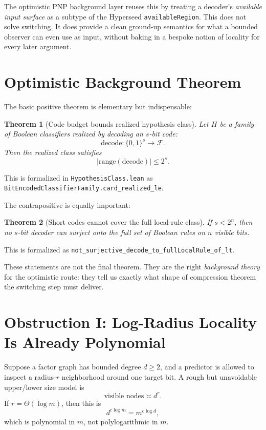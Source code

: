 \documentclass[11pt]{article}
\newtheorem{theorem}{Theorem}[section]
\theoremstyle{remark}
\begin{document}
The optimistic PNP background layer reuses this by treating a decoder's \emph{available
input surface} as a subtype of the Hyperseed \texttt{availableRegion}.  This does not solve
switching.  It does provide a clean ground-up semantics for what a bounded observer can even
use as input, without baking in a bespoke notion of locality for every later argument.

\section{Optimistic Background Theorem}

The basic positive theorem is elementary but indispensable:

\begin{theorem}[Code budget bounds realized hypothesis class]
Let \(H\) be a family of Boolean classifiers realized by decoding an \(s\)-bit code:
\[
  \mathrm{decode} : \{0,1\}^s \to \mathcal{F}.
\]
Then the realized class satisfies
\[
  |\mathrm{range}(\mathrm{decode})| \le 2^s.
\]
\end{theorem}

\noindent
This is formalized in \texttt{HypothesisClass.lean} as
\texttt{BitEncodedClassifierFamily.card\_realized\_le}.

The contrapositive is equally important:

\begin{theorem}[Short codes cannot cover the full local-rule class]
If \(s < 2^n\), then no \(s\)-bit decoder can surject onto the full set of Boolean rules on
\(n\) visible bits.
\end{theorem}

\noindent
This is formalized as
\texttt{not\_surjective\_decode\_to\_fullLocalRule\_of\_lt}.

These statements are not the final theorem.  They are the right \emph{background theory} for
the optimistic route: they tell us exactly what shape of compression theorem the switching
step must deliver.

\section{Obstruction I: Log-Radius Locality Is Already Polynomial}

Suppose a factor graph has bounded degree $d \ge 2$, and a predictor is allowed to inspect a
radius-$r$ neighborhood around one target bit.  A rough but unavoidable upper/lower size model is
\[
  \text{visible nodes} \asymp d^r.
\]
If $r = \Theta(\log m)$, then this is
\[
  d^{c \log m} = m^{c \log d},
\]
which is polynomial in $m$, not polylogarithmic in $m$.
\end{document}
